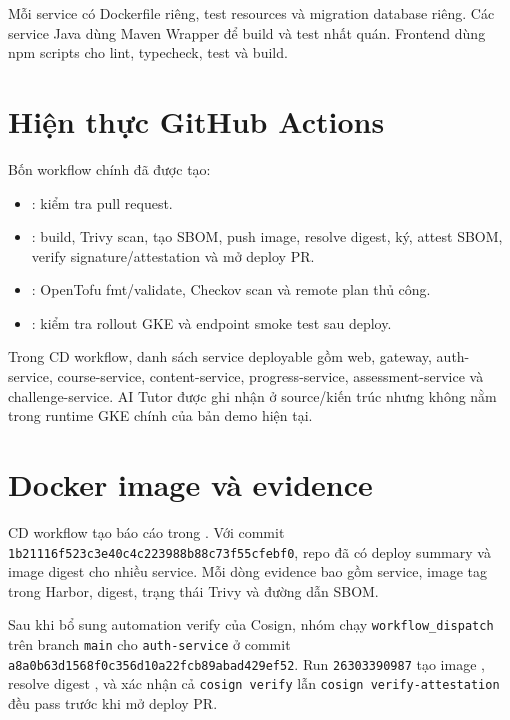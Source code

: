 Mỗi service có Dockerfile riêng, test resources và migration database riêng. Các service Java dùng Maven Wrapper để build và test nhất quán. Frontend dùng npm scripts cho lint, typecheck, test và build.

\section{Hiện thực GitHub Actions}

Bốn workflow chính đã được tạo:

\begin{itemize}
  \item {}: kiểm tra pull request.
  \item {}: build, Trivy scan, tạo SBOM, push image, resolve digest, ký, attest SBOM, verify signature/attestation và mở deploy PR.
  \item {}: OpenTofu fmt/validate, Checkov scan và remote plan thủ công.
  \item {}: kiểm tra rollout GKE và endpoint smoke test sau deploy.
\end{itemize}

Trong CD workflow, danh sách service deployable gồm web, gateway, auth-service, course-service, content-service, progress-service, assessment-service và challenge-service. AI Tutor được ghi nhận ở source/kiến trúc nhưng không nằm trong runtime GKE chính của bản demo hiện tại.

\section{Docker image và evidence}

CD workflow tạo báo cáo trong . Với commit \texttt{1b21116f523c3e40c4c223988b88c73f55cfebf0}, repo đã có deploy summary và image digest cho nhiều service. Mỗi dòng evidence bao gồm service, image tag trong Harbor, digest, trạng thái Trivy và đường dẫn SBOM.

Sau khi bổ sung automation verify của Cosign, nhóm chạy \texttt{workflow\_dispatch} trên branch \texttt{main} cho \texttt{auth-service} ở commit \texttt{a8a0b63d1568f0c356d10a22fcb89abad429ef52}. Run \texttt{26303390987} tạo image , resolve digest , và xác nhận cả \texttt{cosign verify} lẫn \texttt{cosign verify-attestation} đều pass trước khi mở deploy PR.

